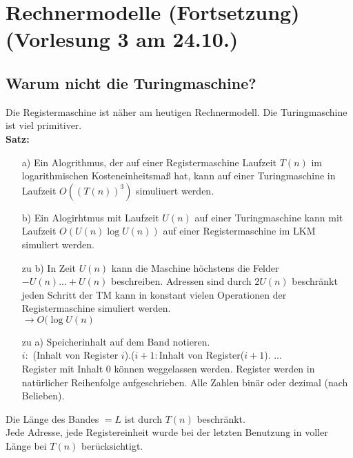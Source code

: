 \section{Rechnermodelle (Fortsetzung) \tiny (Vorlesung 3 am 24.10.)}
\subsection{Warum nicht die Turingmaschine?}
Die Registermaschine ist näher am heutigen Rechnermodell. Die Turingmaschine ist viel primitiver. \\
\textbf{Satz:}
\begin{enumerate}
\item[a)] Ein Alogrithmus, der auf einer Registermaschine Laufzeit $T(n)$ im logarithmischen Kosteneinheitsmaß hat, kann auf einer Turingmaschine in Laufzeit $O((T(n))^3)$ simuliuert werden.\\
\item[b)] Ein Alogirhtmus mit Laufzeit $U(n)$ auf einer Turingmaschine kann mit Laufzeit $O(U(n)\log U(n))$ auf einer Registermaschine im LKM simuliert werden.\\
\end{enumerate}
\begin{enumerate}
\item[zu b)] In Zeit $U(n)$ kann die Maschine höchstens die Felder $-U(n)...+U(n)$ beschreiben. Adressen sind durch $2U(n)$ beschränkt jeden Schritt der TM kann in konstant vielen Operationen der Registermaschine simuliert werden.\\
$\rightarrow O(\log U(n)$ 
\item[zu a)] Speicherinhalt auf dem Band notieren.\\ 
$i :$ (Inhalt von Register $i$)$.$($i+1:$Inhalt von Register($i+1$). ...\\
Register mit Inhalt $0$ können weggelassen werden. Register werden in natürlicher Reihenfolge aufgeschrieben. Alle Zahlen binär oder dezimal (nach Belieben).
\end{enumerate}
Die Länge des Bandes $= L$ ist durch $T(n)$ beschränkt.\\
Jede Adresse, jede Registereinheit wurde bei der letzten Benutzung in voller Länge bei $T(n)$ berücksichtigt.
